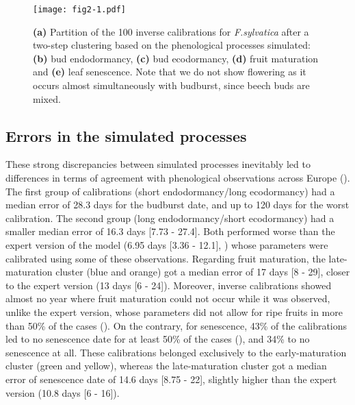 \documentclass[letterpaper,8pt]{extarticle}  %
\begin{document}
\begin{doublespacing}
\begin{linenumbers}
\begin{figure}[htpb]
\centering
\begin{subcaptiongroup}
\label{fig:2A} 
\label{fig:2B}
\label{fig:2C}
\label{fig:2D}
\label{fig:2E}
\end{subcaptiongroup}
\texttt{[image: fig2-1.pdf]}
\caption{\textbf{(a)} Partition of the 100 inverse calibrations for \emph{F.sylvatica} after a two-step clustering based on the phenological processes simulated: \textbf{(b)} bud endodormancy, \textbf{(c)} bud ecodormancy, \textbf{(d)} fruit maturation and \textbf{(e)} leaf senescence. Note that we do not show flowering as it occurs almost simultaneously with budburst, since beech buds are mixed.}
\label{fig:2}
\end{figure}

\subsection{Errors in the simulated processes}

These strong discrepancies between simulated processes inevitably led to differences in terms of agreement with phenological observations across Europe (). The first group of calibrations (short endodormancy/long ecodormancy) had a median error of 28.3 days for the budburst date, and up to 120 days for the worst calibration. The second group (long endodormancy/short ecodormancy) had a smaller median error of 16.3 days [7.73 - 27.4]. Both performed worse than the expert version of the model (6.95 days [3.36 - 12.1], ) whose parameters were calibrated using some of these observations. Regarding fruit maturation, the late-maturation cluster (blue and orange) got a median error of 17 days [8 - 29], closer to the expert version (13 days [6 - 24]). Moreover, inverse calibrations showed almost no year where fruit maturation could not occur while it was observed, unlike the expert version, whose parameters did not allow for ripe fruits in more than 50\% of the cases (). On the contrary, for senescence, 43\% of the calibrations led to no senescence date for at least 50\% of the cases (), and 34\% to no senescence at all. These calibrations belonged exclusively to the early-maturation cluster (green and yellow), whereas the late-maturation cluster got a median error of senescence date of 14.6 days [8.75 - 22], slightly higher than the expert version (10.8 days [6 - 16]).


\end{linenumbers}
\end{doublespacing}
\end{document}
